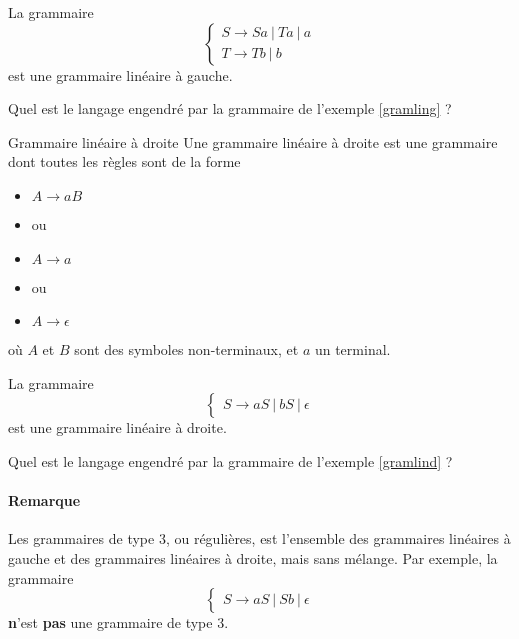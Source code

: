 \begin{example}
\label{gramling}
La grammaire 
\[
\begin{cases}
S \rightarrow Sa~|~Ta~|~a \\
T \rightarrow Tb~|~b
\end{cases}
\]
est une grammaire linéaire à gauche. 
\end{example}

\begin{exercice}
Quel est le langage engendré par la grammaire de l'exemple \ref{gramling} ?
\end{exercice}


\begin{definition}{Grammaire linéaire à droite}{}
Une grammaire linéaire à droite est une grammaire dont toutes les règles sont de la forme 
\begin{itemize}
\item[] $A \rightarrow aB$
\item[] ou
\item[] $A \rightarrow a$
\item[] ou
\item[] $A \rightarrow \epsilon$
\end{itemize}

où $A$ et $B$ sont des symboles non-terminaux, et $a$ un terminal.
\end{definition}

\begin{example}
\label{gramlind}
La grammaire 
\[
\begin{cases}
S \rightarrow aS~|~bS~|~\epsilon
\end{cases}
\]
est une grammaire linéaire à droite. 
\end{example}


\begin{exercice}
Quel est le langage engendré par la grammaire de l'exemple \ref{gramlind} ?
\end{exercice}

\paragraph{Remarque} Les grammaires de type 3, ou régulières, est l'ensemble des grammaires linéaires à gauche et des grammaires linéaires à droite, mais sans mélange. Par exemple, la grammaire 
\[
\begin{cases}
S \rightarrow aS~|~Sb~|~\epsilon
\end{cases}
\]
\textbf{n}'est \textbf{pas} une grammaire de type 3. 

